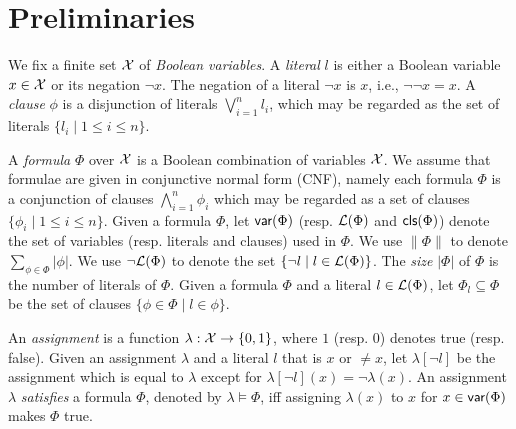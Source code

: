 \section{Preliminaries}\label{sec:prel}

We fix a finite set  $\mathcal{X}$ of \emph{Boolean variables}.
A \emph{literal} $l$ is either a Boolean variable $x\in \mathcal{X}$ or its negation $\neg x$.
The negation of a literal $\neg x$ is $x$, i.e., $\neg\neg x=x$.
A \emph{clause} $\phi$ is a disjunction of literals $\bigvee_{i=1}^n l_i$, which may be regarded as
the set of literals $\{l_i\mid 1\leq i\leq n\}$.

A \emph{formula} $\Phi$ over $\mathcal{X}$ is a Boolean combination of variables $\mathcal{X}$.
We assume that formulae are given in conjunctive normal
form (CNF), namely each formula $\Phi$ is a conjunction of clauses $\bigwedge_{i=1}^n\phi_i$ which may be regarded as a set of clauses $\{\phi_i\mid 1\leq i\leq n\}$. Given a formula $\Phi$, let $\textsf{var}(\Phi)$ (resp. ${\cal L}(\Phi)$  and $\textsf{cls}(\Phi)$) denote the set of variables (resp. literals and clauses) used in $\Phi$.
We use $\|\Phi\|$ to denote $\sum_{\phi\in\Phi}|\phi|$.
We use $\neg{\cal L}(\Phi)$ to denote the set $\{\neg l \mid l\in {\cal L}(\Phi)\}$.
The \emph{size} $|\Phi|$ of $\Phi$ is the number of literals of $\Phi$.
Given a formula $\Phi$ and a literal $l\in{\cal L}(\Phi)$,
let $\Phi_{l}\subseteq \Phi$ be the set of clauses $\{\phi\in\Phi\mid l\in\phi\}$.


An \emph{assignment} is a function $\lambda: \mathcal{X} \rightarrow \{0,1\}$, where $1$ (resp. $0$) denotes true (resp. false).
Given an assignment $\lambda$ and a literal $l$ that is $x$ or $\neq x$, let $\lambda[\neg l]$ be the assignment which is equal to $\lambda$
except for $\lambda[\neg l](x)=\neg \lambda(x)$.
An assignment $\lambda$ \emph{satisfies} a formula $\Phi$, denoted by $\lambda\models \Phi$, iff assigning $\lambda(x)$ to $x$ for $x\in\textsf{var}(\Phi)$ makes $\Phi$ true.

